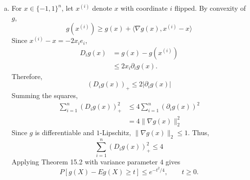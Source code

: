 \documentclass[11pt,a4paper,margin=1in]{article}
\begin{document}
\begin{enumerate}[(a)]
    Let $Y=f_n(X)$ and let $Y'$ be an independent copy of $Y$. Recall that
    \[
        \operatorname{Var}(Y)=\frac12E[(Y-Y')^2]
    \]
    For all sufficiently large $n$, there is an absolute $c_0>0$ such that
    \[
        P[Y=0]\geq\frac12, \qquad P[Y\geq n^{1/4}]\geq c_0
    \]
    On the events $\{Y=0,Y'\geq n^{1/4}\}$ and $\{Y' =0,Y\geq n^{1/4}\}$, we have 
    $(Y-Y')^2\geq\sqrt n$. Thus,
    \begin{align*}
        \operatorname{Var}(Y) &=\frac12E[(Y-Y')^2] \\
        &\geq \frac12\sqrt n\left(P[Y=0]P[Y'\geq n^{1/4}]+P[Y'=0]P[Y\geq n^{1/4}]\right) \\
        &= \sqrt n\,P[Y=0]P[Y\geq n^{1/4}] \\
        &\geq \frac{c_0}{2}\sqrt n
    \end{align*}
    Therefore, $\operatorname{Var}(f_n(X))\geq c\sqrt n$ for an absolute constant 
    $c>0$ and all sufficiently large $n$.

    If $f_n(X)-Ef_n(X)$ were $\sigma^2$-sub-Gaussian with a variance proxy $\sigma^2$ 
    independent of $n$, then its log-MGF would satisfy
    \[
        \log E[e^{\lambda(f_n(X)-Ef_n(X))}]\leq\frac{\sigma^2\lambda^2}{2}
    \]
    Comparing second derivatives at $\lambda=0$ gives
    \[
        \operatorname{Var}(f_n(X))\leq\sigma^2,
    \]
    contradicting $\operatorname{Var}(f_n(X))\geq c\sqrt n\to\infty$. Hence no 
    $\sigma^2$ independent of $n$ can make $f_n(X)-Ef_n(X)$ sub-Gaussian.

    \item For $x\in\{-1,1\}^n$, let $x^{(i)}$ denote $x$ with coordinate $i$ flipped. 
    By convexity of $g$,
    \[
        g(x^{(i)})\geq g(x)+\langle\nabla g(x),x^{(i)}-x\rangle
    \]
    Since $x^{(i)}-x=-2x_ie_i$,
    \begin{align*}
        D_i g(x) &= g(x)-g(x^{(i)}) \\
        &\leq 2x_i\partial_i g(x).
    \end{align*}
    Therefore,
    \[
        (D_i g(x))_+\leq2|\partial_i g(x)|
    \]
    Summing the squares,
    \begin{align*}
        \sum_{i=1}^n(D_i g(x))_+^2 &\leq4\sum_{i=1}^n(\partial_i g(x))^2 \\
        &=4\|\nabla g(x)\|_2^2
    \end{align*}
    Since $g$ is differentiable and $1$-Lipschitz, $\|\nabla g(x)\|_2\leq1$. Thus,
    \[
        \sum_{i=1}^n(D_i g(x))_+^2\leq4
    \]
    Applying Theorem 15.2 with variance parameter $4$ gives
    \[
        P[g(X)-Eg(X)\geq t]\leq e^{-t^2/4}, \qquad t\geq0.
    \]


\end{enumerate}
\end{document}

